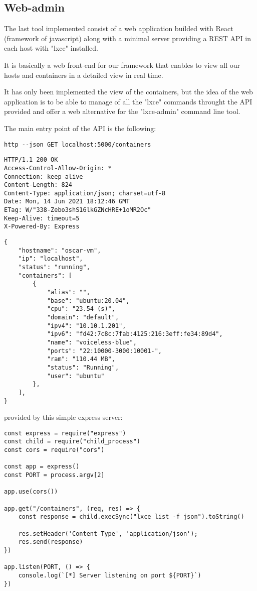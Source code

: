 \newpage
\subsection{Web-admin}
The last tool implemented consist of a web application builded with React (framework of javascript) along with a minimal server providing a REST API in each host with "lxce" installed.

It is basically a web front-end for our framework that enables to view all our hosts and containers in a detailed view in real time.

It has only been implemented the view of the containers, but the idea of the web application is to be able to manage of all the "lxce" commands throught the API provided and offer a web alternative for the "lxce-admin" command line tool.

The main entry point of the API is the following:
\begin{verbatim}
http --json GET localhost:5000/containers
\end{verbatim}
\begin{verbatim}
HTTP/1.1 200 OK
Access-Control-Allow-Origin: *
Connection: keep-alive
Content-Length: 824
Content-Type: application/json; charset=utf-8
Date: Mon, 14 Jun 2021 18:12:46 GMT
ETag: W/"338-Zebo3shS16lkGZNcHRE+1oMR2Oc"
Keep-Alive: timeout=5
X-Powered-By: Express
\end{verbatim}
\begin{verbatim}
{
    "hostname": "oscar-vm",
    "ip": "localhost",
    "status": "running",
    "containers": [
        {
            "alias": "",
            "base": "ubuntu:20.04",
            "cpu": "23.54 (s)",
            "domain": "default",
            "ipv4": "10.10.1.201",
            "ipv6": "fd42:7c8c:7fab:4125:216:3eff:fe34:89d4",
            "name": "voiceless-blue",
            "ports": "22:10000-3000:10001-",
            "ram": "110.44 MB",
            "status": "Running",
            "user": "ubuntu"
        },
    ],
}
\end{verbatim}

provided by this simple express server:
\begin{verbatim}
const express = require("express")
const child = require("child_process")
const cors = require("cors")

const app = express()
const PORT = process.argv[2]

app.use(cors())

app.get("/containers", (req, res) => {
    const response = child.execSync("lxce list -f json").toString()

    res.setHeader('Content-Type', 'application/json');
    res.send(response)
})

app.listen(PORT, () => {
    console.log(`[*] Server listening on port ${PORT}`)
})

\end{verbatim}

